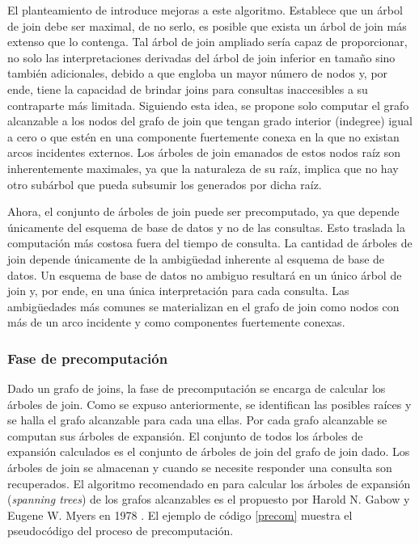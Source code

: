 El planteamiento de \cite{mason2005autojoin} introduce mejoras a este algoritmo. Establece que un \'arbol 
de join debe ser maximal, de no serlo, es posible que exista un \'arbol de join m\'as extenso que lo contenga. 
Tal \'arbol de join ampliado sería capaz de proporcionar, no solo 
las interpretaciones derivadas del \'arbol de join inferior en tamaño sino también adicionales, debido a que engloba 
un mayor número de nodos y, por ende, tiene la capacidad de brindar joins para consultas inaccesibles a su 
contraparte más limitada. Siguiendo esta idea, se propone solo computar el grafo alcanzable 
a los nodos del grafo de join que tengan grado interior (indegree) igual a cero o que est\'en en una 
componente fuertemente conexa en la que no existan arcos incidentes externos. 
Los \'arboles de join emanados de estos nodos raíz son inherentemente maximales, ya que la naturaleza de su raíz, 
implica que no hay otro subárbol que pueda subsumir los generados por dicha raíz.

Ahora, el conjunto de árboles de join puede ser precomputado, ya que depende únicamente del esquema de base de 
datos y no de las consultas. Esto traslada la computación más costosa fuera del tiempo de consulta. La cantidad
de \'arboles de join depende \'unicamente de la ambigüedad inherente al esquema de base de datos. Un esquema 
de base de datos no ambiguo resultar\'a en un único \'arbol de join y, por ende, en una \'unica interpretación 
para cada consulta. Las ambigüedades m\'as comunes se materializan en el grafo de join como nodos con m\'as de 
un arco incidente y como componentes fuertemente conexas.

\subsubsection{Fase de precomputaci\'on}

Dado un grafo de joins, la fase de precomputaci\'on se encarga de calcular los \'arboles de join. Como se expuso 
anteriormente, se identifican las posibles raíces y se halla el grafo alcanzable para cada una ellas. 
Por cada grafo alcanzable se computan sus \'arboles de expansión. El conjunto de todos los \'arboles de 
expansión calculados es el conjunto de \'arboles de join del grafo de join dado. Los \'arboles de join 
se almacenan y cuando se necesite responder una consulta son recuperados. El algoritmo recomendado en \cite{mason2005autojoin} 
para calcular 
los \'arboles de expansión (\emph{spanning trees}) de los grafos alcanzables es el propuesto por Harold N. Gabow y 
Eugene W. Myers en 1978 \cite{gabow1978finding}. El ejemplo de código \ref{precom} muestra el pseudoc\'odigo 
del proceso de precomputaci\'on.

